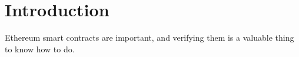 \section{Introduction}
Ethereum smart contracts are important, and verifying them is a valuable thing
to know how to do.
